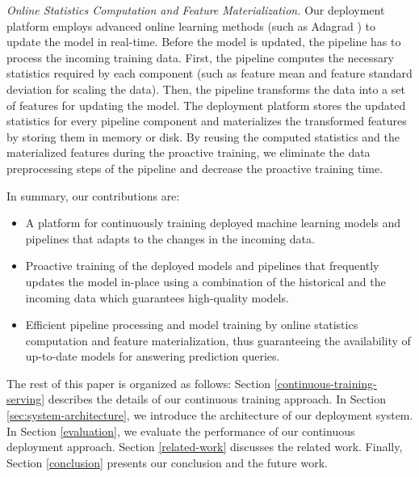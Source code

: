 \textit{Online Statistics Computation and Feature Materialization.}
Our deployment platform employs advanced online learning methods (such as Adagrad \cite{duchi2011adaptive}) to update the model in real-time.
Before the model is updated, the pipeline has to process the incoming training data.
First, the pipeline computes the necessary statistics required by each component (such as feature mean and feature standard deviation for scaling the data).
Then, the pipeline transforms the data into a set of features for updating the model. 
The deployment platform stores the updated statistics for every pipeline component and materializes the transformed features by storing them in memory or disk.
By reusing the computed statistics and the materialized features during the proactive training, we eliminate the data preprocessing steps of the pipeline and decrease the proactive training time.

In summary, our contributions are:
\begin{itemize}
\item A platform for continuously training deployed machine learning models and pipelines that adapts to the changes in the incoming data.
\item Proactive training of the deployed models and pipelines that frequently updates the model in-place using a combination of the historical and the incoming data which guarantees high-quality models.
\item Efficient pipeline processing and model training by online statistics computation and feature materialization, thus guaranteeing the availability of up-to-date models for answering prediction queries.
\end{itemize}

The rest of this paper is organized as follows:
Section \ref{continuous-training-serving} describes the details of our continuous training approach.
In Section \ref{sec:system-architecture}, we introduce the architecture of our deployment system.
In Section \ref{evaluation}, we evaluate the performance of our continuous deployment approach.
Section \ref {related-work} discusses the related work.
Finally, Section \ref{conclusion} presents our conclusion and the future work.
